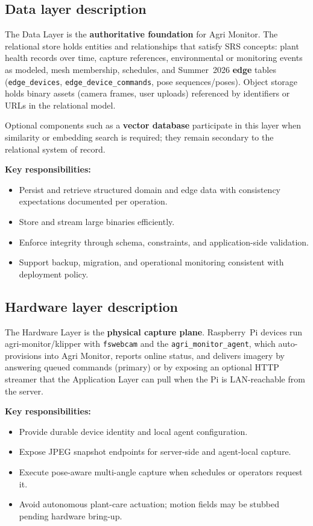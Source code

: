 \subsection{Data layer description}

The Data Layer is the \textbf{authoritative foundation} for Agri Monitor. The relational store holds entities and relationships that satisfy SRS concepts: plant health records over time, capture references, environmental or monitoring events as modeled, mesh membership, schedules, and Summer~2026 \textbf{edge} tables (\texttt{edge\_devices}, \texttt{edge\_device\_commands}, pose sequences/poses). Object storage holds binary assets (camera frames, user uploads) referenced by identifiers or URLs in the relational model.

Optional components such as a \textbf{vector database} participate in this layer when similarity or embedding search is required; they remain secondary to the relational system of record.

\textbf{Key responsibilities:}
\begin{itemize}
  \item Persist and retrieve structured domain and edge data with consistency expectations documented per operation.
  \item Store and stream large binaries efficiently.
  \item Enforce integrity through schema, constraints, and application-side validation.
  \item Support backup, migration, and operational monitoring consistent with deployment policy.
\end{itemize}

\subsection{Hardware layer description}

The Hardware Layer is the \textbf{physical capture plane}. Raspberry~Pi devices run agri-monitor/klipper with \texttt{fswebcam} and the \texttt{agri\_monitor\_agent}, which auto-provisions into Agri Monitor, reports online status, and delivers imagery by answering queued commands (primary) or by exposing an optional HTTP streamer that the Application Layer can pull when the Pi is LAN-reachable from the server.

\textbf{Key responsibilities:}
\begin{itemize}
  \item Provide durable device identity and local agent configuration.
  \item Expose JPEG snapshot endpoints for server-side and agent-local capture.
  \item Execute pose-aware multi-angle capture when schedules or operators request it.
  \item Avoid autonomous plant-care actuation; motion fields may be stubbed pending hardware bring-up.
\end{itemize}

